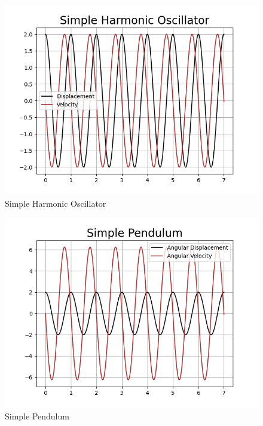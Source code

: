 \documentclass{article}
\begin{document}
\clearpage
\begin{figure}[h]
    \centering
    \includegraphics[width=15cm,height=13cm \textwidth]{2nd_order_diff_using_rk2/Figure_1.png}
\caption{Simple Harmonic Oscillator}
\end{figure}
\begin{figure}[h]
    \centering
    \includegraphics[width=15cm,height=13cm \textwidth]{2nd_order_diff_using_rk2/Figure_3.png}
\caption{Simple Pendulum}
\end{figure}
\end{document}
